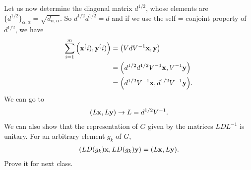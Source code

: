 Let us now determine the diagonal matrix $d^{1/2}$, whose  elements are
$\{d^{1/2}\}_{\alpha,\alpha}=\sqrt{d_{\alpha,\alpha}}$.
So $d^{1/2}d^{1/2}=d$ and if we use the self = conjoint property of $d^{1/2}$, we
have
\begin{align}
    \sum_{i=1}^m\qty(\vb{x}^(i),\vb{y}^(i))&=\qty(VdV^{-1}\vb{x},\vb{y})\\
                                           &=\qty(d^{1/2}d^{1/2}V^{-1}\vb{x},V^{-1}\vb{y})\\
                                           &=\qty(d^{1/2}V^{-1}\vb{x},d^{1/2}V^{-1}\vb{y}).
\end{align}
We can go to
\begin{align}
    \qty(L\vb{x},L\vb{y})\rightarrow L=d^{1/2}V^{-1}.
\end{align}
We can also show that the representation of $G$ given by the matrices $LDL^{-1}$
is unitary. For an arbitrary element $g_k$ of $G$,
\begin{align}
    \qty(LD(g_k)\vb{x},LD(g_k)\vb{y})=\qty(L\vb{x},L\vb{y}).
\end{align}
Prove it for next class.

